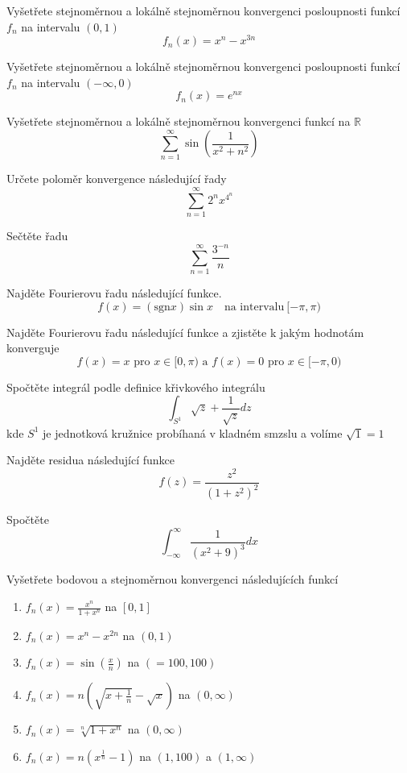 \begin{multicols}{2}

Vyšetřete stejnoměrnou a lokálně stejnoměrnou konvergenci posloupnosti funkcí $f_n$ na intervalu $(0,1)$
$$f_n(x) = x^n - x^{3n}$$

\separator

Vyšetřete stejnoměrnou a lokálně stejnoměrnou konvergenci posloupnosti funkcí $f_n$ na intervalu $(-\infty,0)$
$$f_n(x) = e^{nx}$$

\separator

Vyšetřete stejnoměrnou a lokálně stejnoměrnou konvergenci funkcí na $\mathbb{R}$
$$\sum_{n=1}^\infty \sin \left( \frac{1}{x^2 + n^2} \right)$$

\separator

Určete poloměr konvergence následující řady
$$\sum_{n=1}^\infty 2^n x^{4^n}$$

\separator

Sečtěte řadu
$$\sum_{n=1}^{\infty} \frac{3^{-n}}{n}$$

\separator 

Najděte Fourierovu řadu následující funkce.
$$f(x) = (\textrm{sgn} x) \sin x \quad \textrm{na intervalu} \ [-\pi, \pi)$$

\separator

Najděte Fourierovu řadu následující funkce a zjistěte k jakým hodnotám konverguje
$$f(x)=x \textrm{ pro } x \in [0,\pi) \textrm{ a } f(x)=0 \textrm{ pro } x \in [-\pi,0)$$

\separator

Spočtěte integrál podle definice křivkového integrálu
$$\int_{S^1} \sqrt{z} + \frac{1}{\sqrt{z}} dz$$
kde $S^1$ je jednotková kružnice probíhaná v kladném smzslu a volíme $\sqrt{1}=1$

\separator

Najděte residua následující funkce
$$f(z)=\frac{z^2}{(1+z^2)^2}$$

\separator

Spočtěte
$$\int_{-\infty}^\infty \frac{1}{(x^2 + 9)^3} dx$$

\separator

Vyšetřete bodovou a stejnoměrnou konvergenci následujících funkcí
\begin{enumerate}
\item $f_n(x) = \frac{x^n}{1+x^n}$ na $[0,1]$
\item $f_n(x) = x^n - x^{2n}$ na $(0,1)$
\item $f_n(x) = \sin \left( \frac{x}{n} \right)$ na $(=100,100)$
\item $f_n(x) = n \left( \sqrt{x + \frac{1}{n}} - \sqrt{x} \right)$ na $(0,\infty)$
\item $f_n(x) = \sqrt[n]{1+x^n}$ na $(0,\infty)$
\item $f_n(x) = n \left( x^\frac{1}{n} - 1 \right)$ na $(1,100)$ a $(1,\infty)$
\end{enumerate}


\end{multicols}
